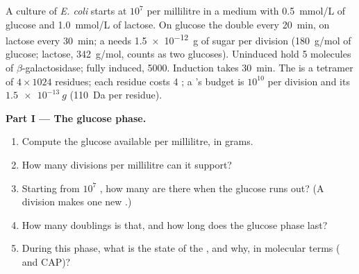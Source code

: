 \begin{problem}
\label{pb:b1:expression-control:1}
A culture of \emph{E. coli} starts at $10^7$  per millilitre in
a medium with \qty{0.5}{mmol/L} of glucose and \qty{1.0}{mmol/L} of
lactose. On glucose the  double every \qty{20}{min}, on lactose
every \qty{30}{min}; a  needs \qty{1.5e-12}{g} of sugar per
division (\qty{180}{g/mol} of glucose; lactose, \qty{342}{g/mol},
counts as two glucoses). Uninduced  hold 5 molecules of
$\beta$-galactosidase; fully induced, \num{5000}. Induction takes
\qty{30}{min}. The  is a tetramer of $4\times 1024$ residues;
each residue costs 4 ; a 's  budget is $10^{10}$ per
division and its  $\qty{1.5e-13}{g}$ (\qty{110}{Da} per residue).

\medskip
\noindent\textbf{Part I --- The glucose phase.}
\begin{enumerate}
  \item Compute the glucose available per millilitre, in grams.
  \item How many divisions per millilitre can it support?
  \item Starting from $10^7$ , how many  are there when the
        glucose runs out? (A division makes one new .)
  \item How many doublings is that, and how long does the glucose
        phase last?
  \item During this phase, what is the state of the , and
        why, in molecular terms ( and CAP)?
\end{enumerate}


\end{problem}
